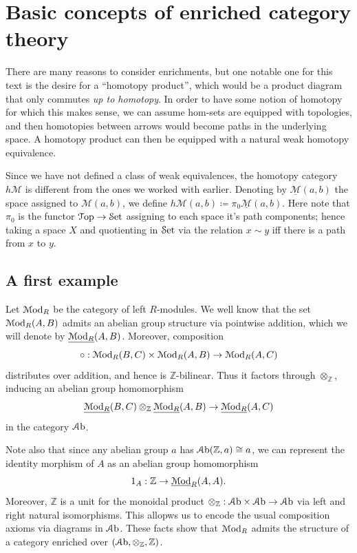 \chapter{Basic concepts of enriched category theory}

There are many reasons to consider enrichments, but one notable one for this text is the desire for a ``homotopy product'', which would be a product diagram that only commutes \emph{up to homotopy}. In order to have some notion of homotopy for which this makes sense, we can assume hom-sets are equipped with topologies, and then homotopies between arrows would become paths in the underlying space. A homotopy product can then be equipped with a natural weak homotopy equivalence.

Since we have not defined a class of weak equivalences, the homotopy category $h\mathcal{M} $ is different from the ones we worked with earlier. Denoting by $\underline{\mathcal{M} }(a,b)$ the space assigned to $\mathcal{M} (a,b)$, we define $h\mathcal{M} (a,b)\coloneqq \pi_0 \underline{\mathcal{M} }(a,b)$. Here note that $\pi_0$ is the functor $\mathcal{T}\mathrm{op} \to \mathcal{S}\mathrm{et} $ assigning to each space it's path components; hence taking a space $X$ and quotienting in $\mathcal{S}\mathrm{et} $ via the relation $x\sim y$ iff there is a path from $x$ to $y$.

\section{A first example}

Let $\mathcal{M}\mathrm{od}_R$ be the category of left $R$-modules. We well know that the set $\mathcal{M}\mathrm{od}_R(A,B)$ admits an abelian group structure via pointwise addition, which we will denote by $\underline{\mathcal{M}\mathrm{od}_R}(A,B)$. Moreover, composition
\[
	\circ :\mathcal{M}\mathrm{od}_R(B,C)\times \mathcal{M}\mathrm{od}_R(A,B) \to \mathcal{M}\mathrm{od}_R(A,C)
\]
distributes over addition, and hence is $\mathbb{Z} $-bilinear. Thus it factors through $\otimes _\mathbb{Z} $, inducing an abelian group homomorphism
\[
	\underline{\mathcal{M}\mathrm{od}_R}(B,C)\otimes_\mathbb{Z}  \underline{\mathcal{M}\mathrm{od}_R}(A,B) \to \underline{\mathcal{M}\mathrm{od}_R}(A,C)
\]
in the category $\mathcal{A}\mathrm{b}$.

Note also that since any abelian group $a$ has $\mathcal{A}\mathrm{b}(\mathbb{Z} ,a)\cong a$, we can represent the identity morphism of $A$ as an abelian group homomorphism
\[
	1_A : \mathbb{Z}  \to \underline{\mathcal{M}\mathrm{od}}_R(A,A)
.\]
Moreover, $\mathbb{Z} $ is a unit for the monoidal product $\otimes _\mathbb{Z} : \mathcal{A}\mathrm{b}\times \mathcal{A}\mathrm{b} \to \mathcal{A}\mathrm{b}$ via left and right natural isomorphisms. This allopws us to encode the usual composition axioms via diagrams in $\mathcal{A}\mathrm{b}$. These facts show that $\mathcal{M}\mathrm{od}_R$ admits the structure of a category enriched over $(\mathcal{A}\mathrm{b},\otimes _\mathbb{Z} ,\mathbb{Z} )$.


